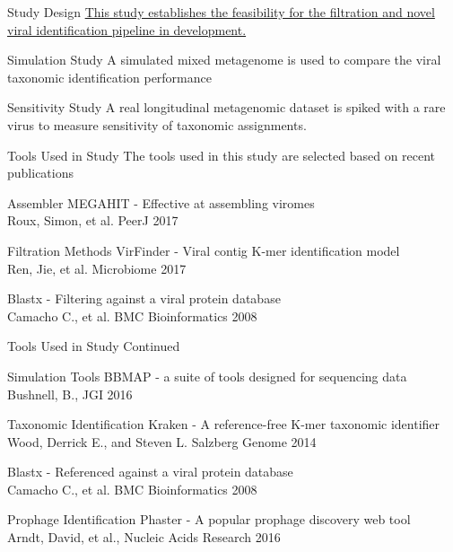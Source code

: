 \documentclass[11pt]{beamer}
\begin{document}
	\begin{frame}{Study Design}
	\hyperlink{https://github.com/glickmac/Novel_Viral_Discovery}{This study establishes the feasibility for the filtration and novel viral identification pipeline in development.}
	
	\begin{block}{Simulation Study}
	A simulated mixed metagenome is used to compare the viral taxonomic identification performance
	\end{block}
	
	\begin{block}{Sensitivity Study}
	A real longitudinal metagenomic dataset is spiked with a rare virus to measure sensitivity of taxonomic assignments. 
	\end{block}
	
	\end{frame}
	
	
	\begin{frame}{Tools Used in Study}
	The tools used in this study are selected based on recent publications
	\begin{block}{Assembler}
	MEGAHIT - Effective at assembling viromes \\
	\tiny{Roux, Simon, et al. PeerJ 2017}
	\end{block}
	
	\begin{block}{Filtration Methods}
	VirFinder - Viral contig K-mer identification model \\ 
	\tiny{Ren, Jie, et al. Microbiome 2017}
	
	\large{Blastx - Filtering against a viral protein database} \\
	\tiny{Camacho C., et al. BMC Bioinformatics 2008}
	\end{block}
	
	\end{frame}
	
	\begin{frame}{Tools Used in Study Continued}
	\begin{block}{Simulation Tools}
	BBMAP - a suite of tools designed for sequencing data \\
	\tiny{Bushnell, B., JGI 2016}
	\end{block}
	
	\begin{block}{Taxonomic Identification}
	Kraken - A reference-free K-mer taxonomic identifier \\
	\tiny{Wood, Derrick E., and Steven L. Salzberg Genome 2014}
	
	\large{Blastx - Referenced against a viral protein database} \\
	\tiny{Camacho C., et al. BMC Bioinformatics 2008}
	\end{block}
	
	\begin{block}{Prophage Identification}
	Phaster - A popular prophage discovery web tool  \\
	\tiny{Arndt, David, et al., Nucleic Acids Research 2016}
	\end{block}
	\end{frame}
	
\end{document}
